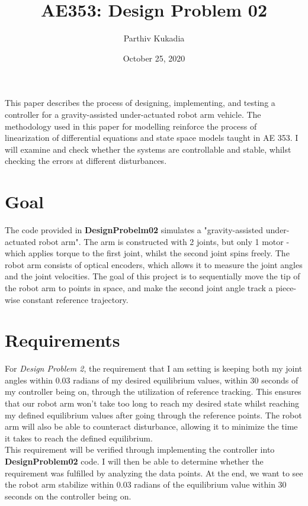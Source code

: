 \documentclass[12pt]{article}
\title{AE353: Design Problem 02}
\author{Parthiv Kukadia}
\date{October 25, 2020}
\begin{document}
\maketitle
This paper describes the process of designing, implementing, and testing a controller for a gravity-assisted under-actuated robot arm vehicle. The methodology used in this paper for modelling reinforce the process of linearization of differential equations and state space models taught in AE 353. I will examine and check whether the systems are controllable and stable, whilst checking the errors at different disturbances. 
\section{Goal}
The code provided in \textbf{DesignProbelm02} simulates a "gravity-assisted under-actuated robot arm". The arm is constructed with 2 joints, but only 1 motor - which applies torque to the first joint, whilst the second joint spins freely. The robot arm consists of optical encoders, which allows it to measure the joint angles and the joint velocities. The goal of this project is to sequentially move the tip of the robot arm to points in space, and make the second joint angle track a piece-wise constant reference trajectory. 
\section{Requirements}
For \textit{Design Problem 2}, the requirement that I am setting is keeping both my joint angles within 0.03 radians of my desired equilibrium values, within 30 seconds of my controller being on, through the utilization of reference tracking. This ensures that our robot arm won't take too long to reach my desired state whilst reaching my defined equilibrium values after going through the reference points. The robot arm will also be able to counteract disturbance, allowing it to minimize the time it takes to reach the defined equilibrium.\\
This requirement will be verified through implementing the controller into \textbf{DesignProblem02} code. I will then be able to determine whether the requirement was fulfilled by analyzing the data points. At the end, we want to see the robot arm stabilize within 0.03 radians of the equilibrium value within 30 seconds on the controller being on.
\end{document}
